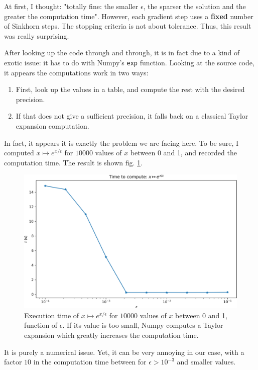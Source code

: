 At first, I thought: "totally fine: the smaller $\epsilon$, the sparser the solution and the greater the computation time". However, each gradient step uses a \textbf{fixed} number of Sinkhorn steps. The stopping criteria is not about tolerance. Thus, this result was really surprising. 

After looking up the code through and through, it is in fact due to a kind of exotic issue: it has to do with Numpy's \texttt{exp} function. Looking at the source code, it appears the computations work in two ways:
\begin{enumerate}
    \item First, look up the values in a table, and compute the rest with the desired precision.
    \item If that does not give a sufficient precision, it falls back on a classical Taylor expansion computation.
\end{enumerate}

In fact, it appears it is exactly the problem we are facing here. To be sure, I computed $x\mapsto e^{x/\epsilon}$ for $10000$ values of $x$ between 0 and 1, and recorded the computation time. The result is shown fig. \ref{fig:exponential_computation_time}.

\begin{figure}[b]
    \centering
    \includegraphics[width=.7\textwidth]{samples/4/exponential_computation_time.png}
    \caption{Execution time of $x \mapsto e^{x/\epsilon}$ for $10000$ values of $x$ between 0 and 1, function of $\epsilon$. If its value is too small, Numpy computes a Taylor expansion which greatly increases the computation time.}
    \label{fig:exponential_computation_time}
\end{figure}

It is purely a numerical issue. Yet, it can be very annoying in our case, with a factor $10$ in the computation time between for $\epsilon>10^{-3}$ and smaller values. 

